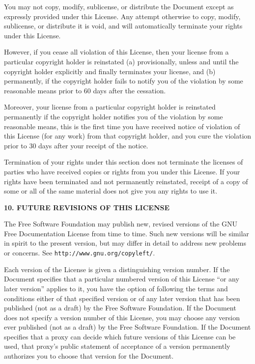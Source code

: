 \documentclass[a4paper]{book}
\begin{document}
You may not copy, modify, sublicense, or distribute the Document
except as expressly provided under this License.  Any attempt
otherwise to copy, modify, sublicense, or distribute it is void, and
will automatically terminate your rights under this License.

However, if you cease all violation of this License, then your license
from a particular copyright holder is reinstated (a) provisionally,
unless and until the copyright holder explicitly and finally
terminates your license, and (b) permanently, if the copyright holder
fails to notify you of the violation by some reasonable means prior to
60 days after the cessation.

Moreover, your license from a particular copyright holder is
reinstated permanently if the copyright holder notifies you of the
violation by some reasonable means, this is the first time you have
received notice of violation of this License (for any work) from that
copyright holder, and you cure the violation prior to 30 days after
your receipt of the notice.

Termination of your rights under this section does not terminate the
licenses of parties who have received copies or rights from you under
this License.  If your rights have been terminated and not permanently
reinstated, receipt of a copy of some or all of the same material does
not give you any rights to use it.


\begin{center}
{\Large\bf 10. FUTURE REVISIONS OF THIS LICENSE\par}
\end{center}


The Free Software Foundation may publish new, revised versions
of the GNU Free Documentation License from time to time.  Such new
versions will be similar in spirit to the present version, but may
differ in detail to address new problems or concerns.  See
\texttt{http://www.gnu.org/copyleft/}.

Each version of the License is given a distinguishing version number.
If the Document specifies that a particular numbered version of this
License ``or any later version'' applies to it, you have the option of
following the terms and conditions either of that specified version or
of any later version that has been published (not as a draft) by the
Free Software Foundation.  If the Document does not specify a version
number of this License, you may choose any version ever published (not
as a draft) by the Free Software Foundation.  If the Document
specifies that a proxy can decide which future versions of this
License can be used, that proxy's public statement of acceptance of a
version permanently authorizes you to choose that version for the
Document.
\end{document}
